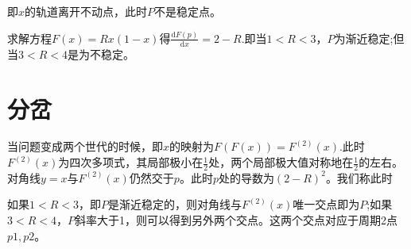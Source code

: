 即\begin{math}x\end{math}的轨道离开不动点，此时\begin{math}P\end{math}不是稳定点。

求解方程\begin{math}F(x)=Rx(1-x)\end{math}得\begin{math}\frac{\mathrm{d} F(p)}{\mathrm{d} x}=2-R\end{math}.即当\begin{math}1<R<3\end{math}，\begin{math}P\end{math}为渐近稳定;但当\begin{math}3<R<4\end{math}是为不稳定。


\section{分岔}
当问题变成两个世代的时候，即\begin{math}x\end{math}的映射为\begin{math}F(F(x))=F^{(2)}(x)\end{math}.此时\begin{math}F^{(2)}(x)\end{math}为四次多项式，其局部极小在\begin{math}\frac{1}{2}\end{math}处，两个局部极大值对称地在\begin{math}\frac{1}{2}\end{math}的左右。对角线\begin{math}y=x\end{math}与\begin{math}F^{(2)}(x)\end{math}仍然交于\begin{math}p\end{math}。此时\begin{math}p\end{math}处的导数为\begin{math}(2-R)^{2}\end{math}。我们称此时

如果\begin{math}1<R<3\end{math}，即\begin{math}P\end{math}是渐近稳定的，则对角线与\begin{math}F^{(2)}(x)\end{math}唯一交点即为\begin{math}P\end{math};如果\begin{math}3<R<4\end{math}，\begin{math}P\end{math}斜率大于1，则可以得到另外两个交点。这两个交点对应于周期2点\begin{math}p1,p2\end{math}。

